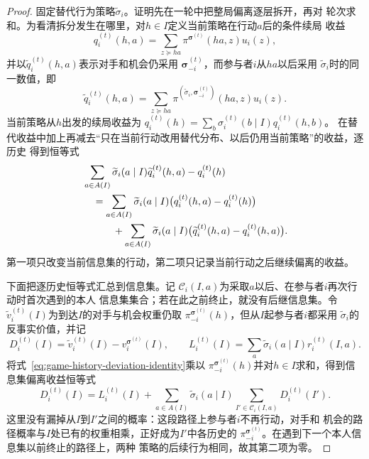 \begin{proof}
固定替代行为策略\(\widetilde{\sigma}_i\)。证明先在一轮中把整局偏离逐层拆开，再对
轮次求和。为看清拆分发生在哪里，对\(h\in I\)定义当前策略在行动\(a\)后的条件续局
收益
\[
  q_i^{(t)}(h,a)
  =
  \sum_{z\succeq ha}
  \pi^{\bm{\sigma}^{(t)}}(ha,z)u_i(z),
\]
并以\(\widetilde q_i^{(t)}(h,a)\)表示对手和机会仍采用
\(\bm{\sigma}_{-i}^{(t)}\)，而参与者\(i\)从\(ha\)以后采用
\(\widetilde{\sigma}_i\)时的同一数值，即
\[
  \widetilde q_i^{(t)}(h,a)
  =
  \sum_{z\succeq ha}
  \pi^{(\widetilde{\sigma}_i,\bm{\sigma}_{-i}^{(t)})}(ha,z)
  u_i(z).
\]
当前策略从\(h\)出发的续局收益为
\(q_i^{(t)}(h)=\sum_b\sigma_i^{(t)}(b\mid I)q_i^{(t)}(h,b)\)。
在替代收益中加上再减去“只在当前行动改用替代分布、以后仍用当前策略”的收益，逐历史
得到恒等式
\begin{align}
  &\sum_{a\in A(I)}
  \widetilde{\sigma}_i(a\mid I)
  \widetilde q_i^{(t)}(h,a)
  -
  q_i^{(t)}(h)
  \notag\\
  &\quad=
  \sum_{a\in A(I)}
  \widetilde{\sigma}_i(a\mid I)
  \bigl(q_i^{(t)}(h,a)-q_i^{(t)}(h)\bigr)
  \notag\\
  &\qquad\quad+
  \sum_{a\in A(I)}
  \widetilde{\sigma}_i(a\mid I)
  \bigl(
    \widetilde q_i^{(t)}(h,a)-q_i^{(t)}(h,a)
  \bigr).
  \label{eq:game-history-deviation-identity}
\end{align}
第一项只改变当前信息集的行动，第二项只记录当前行动之后继续偏离的收益。

下面把逐历史恒等式汇总到信息集。记
\(\mathcal{C}_i(I,a)\)为采取\(a\)以后、在参与者\(i\)再次行动时首次遇到的本人
信息集集合；若在此之前终止，就没有后继信息集。令
\(\widetilde v_i^{(t)}(I)\)为到达\(I\)的对手与机会权重仍取
\(\pi_{-i}^{\bm{\sigma}^{(t)}}(h)\)，但从\(I\)起参与者\(i\)都采用
\(\widetilde{\sigma}_i\)的反事实价值，并记
\[
  D_i^{(t)}(I)
  =
  \widetilde v_i^{(t)}(I)
  -
  v_i^{\bm{\sigma}^{(t)}}(I),
  \qquad
  L_i^{(t)}(I)
  =
  \sum_a
  \widetilde{\sigma}_i(a\mid I)r_i^{(t)}(I,a).
\]
将式~\eqref{eq:game-history-deviation-identity}乘以
\(\pi_{-i}^{\bm{\sigma}^{(t)}}(h)\)并对\(h\in I\)求和，得到信息集偏离收益恒等式
\begin{equation}
  D_i^{(t)}(I)
  =
  L_i^{(t)}(I)
  +
  \sum_{a\in A(I)}
  \widetilde{\sigma}_i(a\mid I)
  \sum_{I'\in\mathcal{C}_i(I,a)}
  D_i^{(t)}(I').
  \label{eq:game-information-set-deviation-identity}
\end{equation}
这里没有漏掉从\(I\)到\(I'\)之间的概率：这段路径上参与者\(i\)不再行动，对手和
机会的路径概率与\(I\)处已有的权重相乘，正好成为\(I'\)中各历史的
\(\pi_{-i}^{\bm{\sigma}^{(t)}}\)。在遇到下一个本人信息集以前终止的路径上，两种
策略的后续行为相同，故其第二项为零。


\end{proof}
